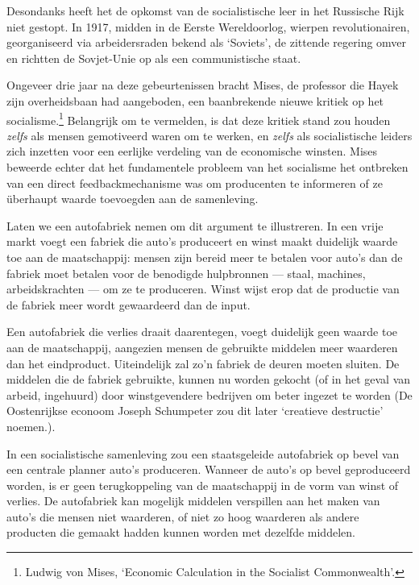 \documentclass[smalldemyvopaper,11pt,twoside,onecolumn,openright,extrafontsizes,hidelinks]{memoir}
\begin{document}
Desondanks heeft het de opkomst van de socialistische leer in het
Russische Rijk niet gestopt. In 1917, midden in de Eerste Wereldoorlog,
wierpen revolutionairen, georganiseerd via arbeidersraden bekend als
`Soviets', de zittende regering omver en richtten de Sovjet-Unie op als
een communistische staat.

Ongeveer drie jaar na deze gebeurtenissen bracht Mises, de professor die
Hayek zijn overheidsbaan had aangeboden, een baanbrekende nieuwe kritiek
op het socialisme.\footnote{\hspace{0pt}Ludwig von Mises, `Economic
  Calculation in the Socialist Commonwealth'.} Belangrijk om te
vermelden, is dat deze kritiek stand zou houden \emph{zelfs} als mensen
gemotiveerd waren om te werken, en \emph{zelfs} als socialistische
leiders zich inzetten voor een eerlijke verdeling van de economische
winsten. Mises beweerde echter dat het fundamentele probleem van het
socialisme het ontbreken van een direct feedbackmechanisme was om
producenten te informeren of ze überhaupt waarde toevoegden aan de
samenleving.

Laten we een autofabriek nemen om dit argument te illustreren. In een
vrije markt voegt een fabriek die auto's produceert en winst maakt
duidelijk waarde toe aan de maatschappij: mensen zijn bereid meer te
betalen voor auto's dan de fabriek moet betalen voor de benodigde
hulpbronnen --- staal, machines, arbeidskrachten --- om ze te
produceren. Winst wijst erop dat de productie van de fabriek meer wordt
gewaardeerd dan de input.

Een autofabriek die verlies draait daarentegen, voegt duidelijk geen
waarde toe aan de maatschappij, aangezien mensen de gebruikte middelen
meer waarderen dan het eindproduct. Uiteindelijk zal zo'n fabriek de
deuren moeten sluiten. De middelen die de fabriek gebruikte, kunnen nu
worden gekocht (of in het geval van arbeid, ingehuurd) door
winstgevendere bedrijven om beter ingezet te worden (De Oostenrijkse
econoom Joseph Schumpeter zou dit later `creatieve destructie' noemen.).

In een socialistische samenleving zou een staatsgeleide autofabriek op
bevel van een centrale planner auto's produceren. Wanneer de auto's op
bevel geproduceerd worden, is er geen terugkoppeling van de maatschappij
in de vorm van winst of verlies. De autofabriek kan mogelijk middelen
verspillen aan het maken van auto's die mensen niet waarderen, of niet
zo hoog waarderen als andere producten die gemaakt hadden kunnen worden
met dezelfde middelen.
\end{document}
